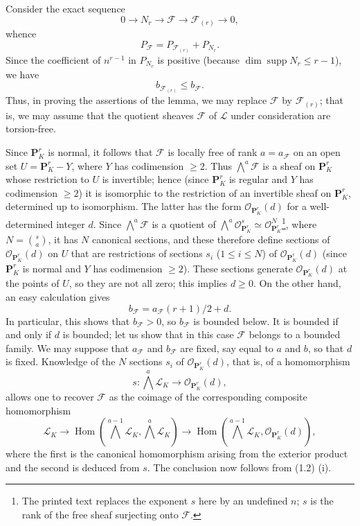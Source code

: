 Consider the exact sequence
\[
0\longrightarrow N_r\longrightarrow\mathcal F
\longrightarrow\mathcal F_{(r)}\longrightarrow0,
\]
whence
\[
P_{\mathcal F}=P_{\mathcal F_{(r)}}+P_{N_r}.
\]
Since the coefficient of $n^{r-1}$ in $P_{N_r}$ is positive (because
$\dim\operatorname{supp}N_r\leq r-1$), we have
\[
b_{\mathcal F_{(r)}}\leq b_{\mathcal F}.
\]
Thus, in proving the assertions of the lemma, we may replace $\mathcal F$ by
$\mathcal F_{(r)}$; that is, we may assume that the quotient sheaves
$\mathcal F$ of $\mathcal L$ under consideration are torsion-free.

Since $\mathbf P^r_K$ is normal, it follows that $\mathcal F$ is locally free
of rank $a=a_{\mathcal F}$ on an open set $U=\mathbf P^r_K-Y$, where $Y$ has
codimension $\geq2$. Thus $\bigwedge^a\mathcal F$ is a sheaf on
$\mathbf P^r_K$ whose restriction to $U$ is invertible; hence (since
$\mathbf P^r_K$ is regular and $Y$ has codimension $\geq2$) it is isomorphic
to the restriction of an invertible sheaf on $\mathbf P^r_K$, determined up
to isomorphism. The latter has the form $\mathcal O_{\mathbf P^r_K}(d)$ for a
well-determined integer $d$. Since $\bigwedge^a\mathcal F$ is a quotient of
$\bigwedge^a\mathcal O_{\mathbf P^r_K}^{s}\simeq
\mathcal O_{\mathbf P^r_K}^{N}$\footnote{The printed text replaces the
exponent $s$ here by an undefined $n$; $s$ is the rank of the free sheaf
surjecting onto $\mathcal F$.}, where $N=\binom{s}{a}$, it has $N$ canonical
sections, and these therefore define sections of
$\mathcal O_{\mathbf P^r_K}(d)$ on $U$ that are restrictions of sections $s_i$
($1\leq i\leq N$) of $\mathcal O_{\mathbf P^r_K}(d)$ (since
$\mathbf P^r_K$ is normal and $Y$ has codimension $\geq2$). These sections
generate $\mathcal O_{\mathbf P^r_K}(d)$ at the points of $U$, so they are not
all zero; this implies $d\geq0$. On the other hand, an easy calculation gives
\[
b_{\mathcal F}=a_{\mathcal F}(r+1)/2+d.
\]
In particular, this shows that $b_{\mathcal F}>0$, so $b_{\mathcal F}$ is
bounded below. It is bounded if and only if $d$ is bounded; let us show that
in this case $\mathcal F$ belongs to a bounded family. We may suppose that
$a_{\mathcal F}$ and $b_{\mathcal F}$ are fixed, say equal to $a$ and $b$, so
that $d$ is fixed. Knowledge of the $N$ sections $s_i$ of
$\mathcal O_{\mathbf P^r_K}(d)$, that is, of a homomorphism
\[
s:\bigwedge^a\mathcal L_K\longrightarrow\mathcal O_{\mathbf P^r_K}(d),
\]
allows one to recover $\mathcal F$ as the coimage of the corresponding
composite homomorphism
\[
\mathcal L_K\longrightarrow
\operatorname{Hom}\!\left(\bigwedge^{a-1}\mathcal L_K,
\bigwedge^a\mathcal L_K\right)\longrightarrow
\operatorname{Hom}\!\left(\bigwedge^{a-1}\mathcal L_K,
\mathcal O_{\mathbf P^r_K}(d)\right),
\]
where the first is the canonical homomorphism arising from the exterior
product and the second is deduced from $s$. The conclusion now follows from
(1.2) (i).

